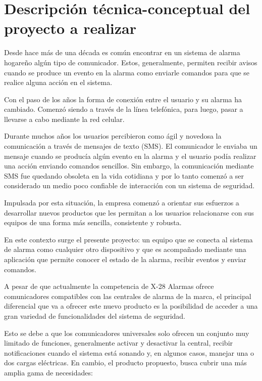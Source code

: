 \documentclass[
11pt, %
]{charter}
\begin{document}
\section{Descripción técnica-conceptual del proyecto a realizar}
\label{sec:descripcion}


Desde hace más de una década es común encontrar en un sistema de alarma hogareño algún tipo de comunicador. Estos, generalmente, permiten recibir avisos cuando se produce un evento en la alarma como enviarle comandos para que se realice alguna acción en el sistema.

Con el paso de los años la forma de conexión entre el usuario y su alarma ha cambiado. Comenzó siendo a través de la línea telefónica, para luego, pasar a llevarse a cabo mediante la red celular. 

Durante muchos años los usuarios percibieron como ágil y novedosa la comunicación a través de mensajes de texto (SMS). El comunicador le enviaba un mensaje cuando se producía algún evento en la alarma y el usuario podía realizar una acción enviando comandos sencillos. Sin embargo, la comunicación mediante SMS fue quedando obsoleta en la vida cotidiana y por lo tanto comenzó a ser considerado un medio poco confiable de interacción con un sistema de seguridad.

Impulsada por esta situación, la empresa comenzó a orientar sus esfuerzos a desarrollar nuevos productos que les permitan a los usuarios relacionarse con sus equipos de una forma más sencilla, consistente y robusta.

En este contexto surge el presente proyecto: un equipo que se conecta al sistema de alarma como cualquier otro dispositivo y que es acompañado mediante una aplicación que permite conocer el estado de la alarma, recibir eventos y enviar comandos.

A pesar de que actualmente la competencia de X-28 Alarmas ofrece comunicadores compatibles con las centrales de alarma de la marca, el principal diferencial que va a ofrecer este nuevo producto es la posibilidad de acceder a una gran variedad de funcionalidades del sistema de seguridad. 

Esto se debe a que los comunicadores universales solo ofrecen un conjunto muy limitado de funciones, generalmente activar y desactivar la central, recibir notificaciones cuando el sistema está sonando y, en algunos casos, manejar una o dos cargas eléctricas. En cambio, el producto propuesto, busca cubrir una más amplia gama de necesidades:
\end{document}
